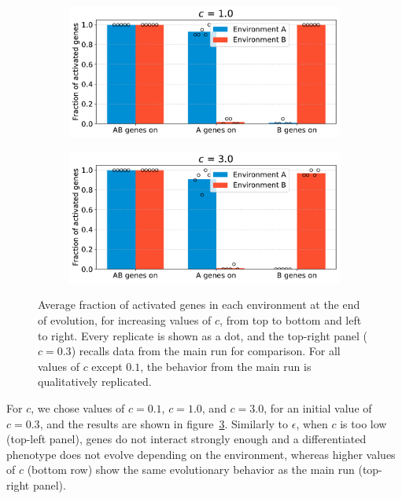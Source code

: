 \begin{figure}[H]
  \begin{subfigure}[t]{0.49\textwidth}
    \includegraphics[width=\textwidth]{alife/img/mean_activation_inter-coef-1.0.pdf}
    \label{subfig:alife:param_c_3}
  \end{subfigure}
  \begin{subfigure}[t]{0.49\textwidth}
    \includegraphics[width=\textwidth]{alife/img/mean_activation_inter-coef-3.0.pdf}
    \label{subfig:alife:param_c_4}
  \end{subfigure}
  \caption[Parameter exploration in the proof-of-concept model: varying $c$]{Average fraction of activated genes in each environment at the end of evolution, for increasing values of $c$, from top to bottom and left to right.
  Every replicate is shown as a dot, and the top-right panel ($c = 0.3$) recalls data from the main run for comparison.
  For all values of $c$ except $0.1$, the behavior from the main run is qualitatively replicated.}
  \label{fig:alife:param_c}
\end{figure}

For $c$, we chose values of $c = 0.1$, $c = 1.0$, and $c = 3.0$, for an initial value of $c = 0.3$, and the results are shown in figure~\ref{fig:alife:param_c}.
Similarly to $\epsilon$, when $c$ is too low (top-left panel), genes do not interact strongly enough and a differentiated phenotype does not evolve depending on the environment, whereas higher values of $c$ (bottom row) show the same evolutionary behavior as the main run (top-right panel).

